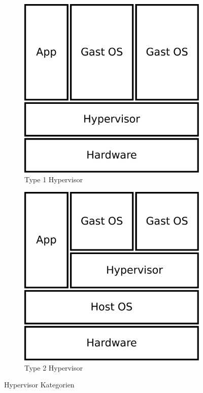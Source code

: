 \documentclass[
  a4paper,					    %
  twoside,
  DIV=calc,     				%
  bibliography=totoc,
  cleardoublepage=empty,
  ngerman,     					%
  final       					%
]{scrbook}
\begin{document}
\begin{figure}
    \centering
    \begin{subfigure}[b]{0.4\textwidth}
        \centering
        \includegraphics[width=\textwidth]{virt_type1}
        \caption{Type 1 Hypervisor}
        \label{fig:hypervisor_type1}
    \end{subfigure}
    \qquad
    \begin{subfigure}[b]{0.4\textwidth}
        \centering
        \includegraphics[width=\textwidth]{virt_type2}
        \caption{Type 2 Hypervisor}
        \label{fig:hypervisor_type2}
    \end{subfigure}
    \caption{Hypervisor Kategorien}\label{fig:hypervisor}
\end{figure}
\end{document}
